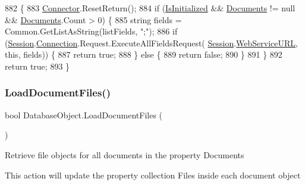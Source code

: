 \begin{DoxyCode}
882                                                      \{
883         \mbox{\hyperlink{class_connector}{Connector}}.ResetReturn();
884         \textcolor{keywordflow}{if} (\mbox{\hyperlink{class_database_object_a5fe036d32a30eb10d1b3f6a30263f740}{IsInitialized}} && \mbox{\hyperlink{class_database_object_afaf1159aa427c5bcce01c4b8c6f34514}{Documents}} != null && 
      \mbox{\hyperlink{class_database_object_afaf1159aa427c5bcce01c4b8c6f34514}{Documents}}.Count > 0) \{
885             \textcolor{keywordtype}{string} fields = Common.GetListAsString(listFields, \textcolor{stringliteral}{";"});
886             \textcolor{keywordflow}{if} (\mbox{\hyperlink{class_database_object_aa8484162b7d2a7c4c9426bca13c64c07}{Session}}.\mbox{\hyperlink{class_session_object_a014bdbf705a753540e19bfb53030c55c}{Connection}}.Request.ExecuteAllFieldsRequest(
      \mbox{\hyperlink{class_database_object_aa8484162b7d2a7c4c9426bca13c64c07}{Session}}.\mbox{\hyperlink{class_session_object_a697c071c812fbf7ad1166b896fb44c16}{WebServiceURL}}, \textcolor{keyword}{this}, fields)) \{
887                 \textcolor{keywordflow}{return} \textcolor{keyword}{true};
888             \} \textcolor{keywordflow}{else} \{
889                 \textcolor{keywordflow}{return} \textcolor{keyword}{false};
890             \}
891         \}
892         \textcolor{keywordflow}{return} \textcolor{keyword}{true};
893     \}
\end{DoxyCode}
\mbox{\label{class_database_object_acdf5c9ee898d4473350a2f4878af5a23}} 
\subsubsection{\texorpdfstring{Load\+Document\+Files()}{LoadDocumentFiles()}}
{\footnotesize\ttfamily bool Database\+Object.\+Load\+Document\+Files (\begin{DoxyParamCaption}{ }\end{DoxyParamCaption})}



Retrieve file objects for all documents in the property \textquotesingle{}Documents\textquotesingle{} 

This action will update the property collection Files inside each document object

